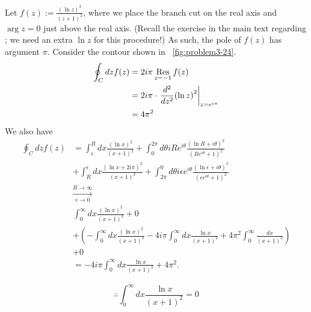Let $f(z) := \frac{{\left( \ln z \right)}^2}{{\left( z + 1 \right)}^2}$,
where we place the branch cut on the real axis and $\arg z = 0$ just above the real axis.
(Recall the exercise in the main text regarding ;
we need an extra $\ln z$ for this procedure!)
As such, the pole of $f(z)$ has argument $\pi$.
Consider the contour shown in ~\ref{fig:problem3-24}.
\begin{align*}
	\oint_C dz f(z)
	&= 2i\pi \mathop{\mathrm{Res}}_{z=-1} f(z) \\
	&= 2i\pi \cdot {\left. \frac{d^2}{dz^2} {\left( \ln z \right)}^2 \right|}_{z = e^{i\pi}} \\
	&= 4\pi^2
\end{align*}
We also have
\begin{align*} %
    \oint_C dz f(z)
    &= \int_\epsilon^R dx \frac{{\left( \ln x \right)}^2}{{\left( x + 1 \right)}^2}
      + \int_0^{2\pi} d\theta iRe^{i\theta} \frac{{\left( \ln R + i\theta\right)}^2}{{\left( Re^{i\theta} + 1 \right)}^2} \\
    & + \int_R^\epsilon dx \frac{{\left( \ln x + 2i\pi \right)}^2}{{\left( x + 1 \right)}^2}
      + \int_{2\pi}^0 d\theta i\epsilon e^{i\theta} \frac{{\left(\ln\epsilon + i\theta\right)}^2}{{\left( \epsilon e^{i\theta} + 1 \right)}^2} \\
    &\xrightarrow[\epsilon \rightarrow 0]{R \rightarrow \infty} \\
    &   \int_0^\infty dx \frac{{\left( \ln x \right)}^2}{{\left( x + 1 \right)}^2} + 0 \\
    & + \left( - \int_0^\infty dx \frac{{\left( \ln x \right)}^2}{{\left( x + 1 \right)}^2}
      - 4i\pi \int_0^\infty dx \frac{\ln x}{{\left( x + 1 \right)}^2}
      + 4\pi^2 \int_0^\infty \frac{dx}{{\left( x + 1 \right)}^2} \right) \\
    & + 0 \\
    &= -4i\pi \int_0^\infty dx \frac{\ln x}{{\left( x + 1 \right)}^2} + 4\pi^2.
\end{align*}

\[
	\therefore \int_0^\infty dx \frac{\ln x}{{\left( x + 1 \right)}^2} = 0
\]
